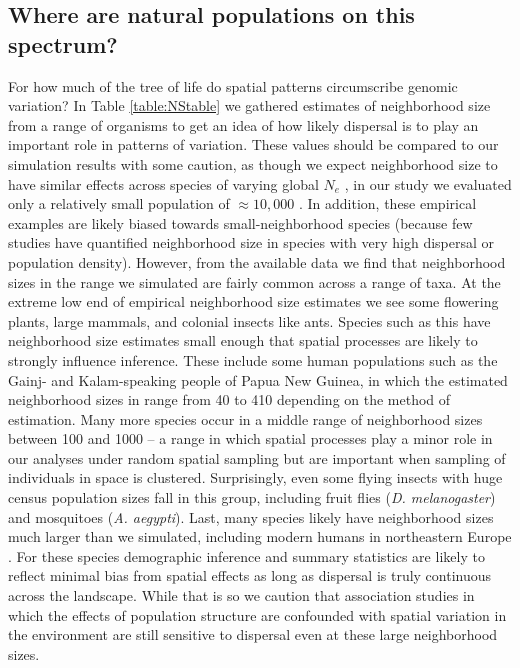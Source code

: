 \documentclass[10pt,twoside,lineno,hidelinks]{preprint}
\begin{document}
\subsection{Where are natural populations on this spectrum?}
For how much of the tree of life do spatial patterns circumscribe genomic variation? In Table \ref{table:NStable} we gathered estimates of neighborhood size from a range of organisms to get an idea of how likely dispersal is to play an important role in patterns of variation. These values should be compared to our simulation results with some caution, as though we expect neighborhood size to have similar effects across species of varying global $N_e$ \citep{Wright1946}, in our study we evaluated only a relatively small population of $\approx 10,000$ . In addition, these empirical examples are likely biased towards small-neighborhood species (because few studies have quantified neighborhood size in species with very high dispersal or population density). However, from the available data we find that neighborhood sizes in the range we simulated are fairly common across a range of taxa. At the extreme low end of empirical neighborhood size estimates we see some flowering plants, large mammals, and colonial insects like ants. Species such as this have neighborhood size estimates small enough that spatial processes are likely to strongly influence inference. These include some human populations such as the Gainj- and Kalam-speaking people of Papua New Guinea, in which the estimated neighborhood sizes in \citep{Rousset1997} range from 40 to 410 depending on the method of estimation. Many more species occur in a middle range of neighborhood sizes between 100 and 1000 -- a range in which spatial processes play a minor role in our analyses under random spatial sampling but are important when sampling of individuals in space is clustered. Surprisingly, even some flying insects with huge census population sizes fall in this group, including fruit flies (\textit{D. melanogaster}) and mosquitoes (\textit{A. aegypti}). Last, many species likely have neighborhood sizes much larger than we simulated, including modern humans in northeastern Europe \citep{Ringbauer2017}. For these species demographic inference and summary statistics are likely to reflect minimal bias from spatial effects as long as dispersal is truly continuous across the landscape. While that is so we caution that association studies in which the effects of population structure are confounded with spatial variation in the environment are still sensitive to dispersal even at these large neighborhood sizes.
\end{document}

